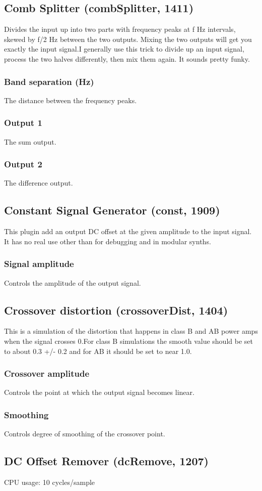\documentclass[11pt]{article}
\begin{document}
      \subsection{Comb Splitter (combSplitter, 1411)\label{combSplitter}\label{id1411}}
Divides the input up into two parts with frequency peaks at f Hz intervals, skewed by f/2 Hz between the two outputs. Mixing the two outputs will get you exactly the input signal.I generally use this trick to divide up an input signal, process the two halves differently, then mix them again. It sounds pretty funky.\subsubsection*{Band separation (Hz)}
The distance between the frequency peaks.\subsubsection*{Output 1}
The sum output.\subsubsection*{Output 2}
The difference output.\subsection{Constant Signal Generator (const, 1909)\label{const}\label{id1909}}
This plugin add an output DC offset at the given amplitude to the input
signal. It has no real use other than for debugging and in modular synths.\subsubsection*{Signal amplitude}
Controls the amplitude of the output signal.\subsection{Crossover distortion (crossoverDist, 1404)\label{crossoverDist}\label{id1404}}
This is a simulation of the distortion that happens in class B and AB power amps when the signal crosses 0.For class B simulations the smooth value should be set to about 0.3 +/- 0.2 and for AB it should be set to near 1.0.\subsubsection*{Crossover amplitude}
Controls the point at which the output signal becomes linear.\subsubsection*{Smoothing}
Controls degree of smoothing of the crossover point.\subsection{DC Offset Remover (dcRemove, 1207)\label{dcRemove}\label{id1207}}
CPU usage: 10 cycles/sample
\end{document}
